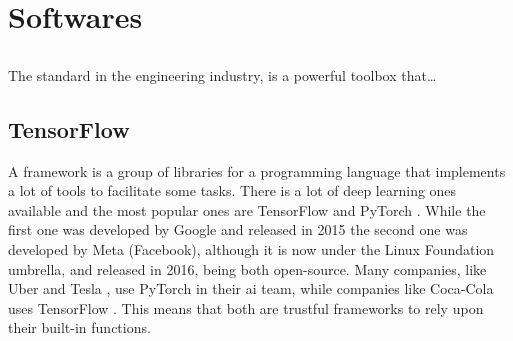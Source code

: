 \section{Softwares}

\subsection{\matlab}

The standard in the engineering industry, \matlab is a powerful toolbox that\ldots

\subsection{TensorFlow}

A framework is a group of libraries for a programming language that implements a lot of tools to facilitate some tasks. 
There is a lot of deep learning ones available and the most popular ones are TensorFlow \citep{abadi2016} and PyTorch \citep{paszke2019}. 
While the first one was developed by Google and released in 2015 the second one was developed by Meta (Facebook), although it is now under the Linux Foundation umbrella, and released in 2016, being both open-source.
Many companies, like Uber \citep{goodman2017} and Tesla \citep{pytorch2019}, use PyTorch in their \gls*{ai} team, while companies like Coca-Cola uses TensorFlow \citep{tensorflow2018}.
This means that both are trustful frameworks to rely upon their built-in functions.



